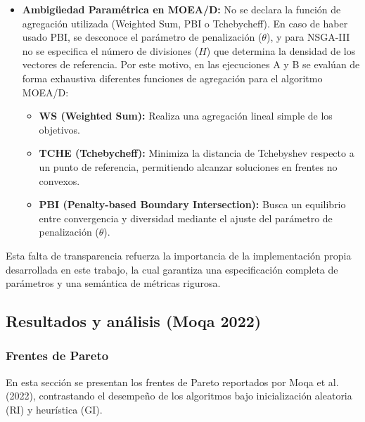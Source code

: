 \documentclass[a4paper,10pt]{article}
\begin{document}
\begin{itemize}
    \item \textbf{Ambigüedad Paramétrica en MOEA/D:} No se declara la función de agregación utilizada (Weighted Sum, PBI o Tchebycheff). En caso de haber usado PBI, se desconoce el parámetro de penalización ($\theta$), y para NSGA-III no se especifica el número de divisiones ($H$) que determina la densidad de los vectores de referencia.
    Por este motivo, en las ejecuciones A y B se evalúan de forma exhaustiva diferentes funciones de agregación para el algoritmo MOEA/D: 
    \begin{itemize}
        \item \textbf{WS (Weighted Sum):} Realiza una agregación lineal simple de los objetivos.
        \item \textbf{TCHE (Tchebycheff):} Minimiza la distancia de Tchebyshev respecto a un punto de referencia, permitiendo alcanzar soluciones en frentes no convexos.
        \item \textbf{PBI (Penalty-based Boundary Intersection):} Busca un equilibrio entre convergencia y diversidad mediante el ajuste del parámetro de penalización ($\theta$).
    \end{itemize}
\end{itemize}



Esta falta de transparencia refuerza la importancia de la implementación propia desarrollada en este trabajo, la cual garantiza una especificación completa de parámetros y una semántica de métricas rigurosa.

\subsection{Resultados y análisis (Moqa 2022)}
\label{sec:res_analisis_moqa}

\subsubsection{Frentes de Pareto}
En esta sección se presentan los frentes de Pareto reportados por Moqa et al. (2022), contrastando el desempeño de los algoritmos bajo inicialización aleatoria (RI) y heurística (GI).
\end{document}
